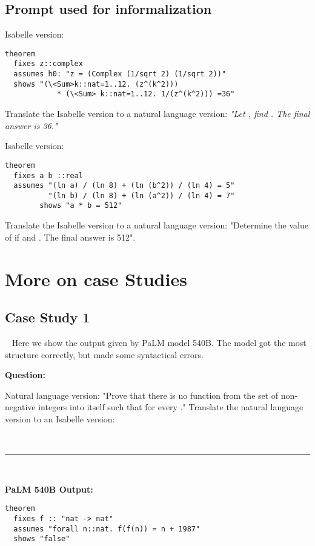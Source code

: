 \documentclass{article}
\begin{document}
\subsection{Prompt used for informalization}
\label{appendix:prompt_case_informal}

\begin{boxB}
Isabelle version:
\begin{lstlisting}
theorem
  fixes z::complex
  assumes h0: "z = (Complex (1/sqrt 2) (1/sqrt 2))"
  shows "(\<Sum>k::nat=1..12. (z^(k^2))) 
            * (\<Sum> k::nat=1..12. 1/(z^(k^2))) =36" 
\end{lstlisting}
Translate the Isabelle version to a natural language version:
\emph{"Let , find . The final answer is 36."}


Isabelle version:
\begin{lstlisting}
theorem
  fixes a b ::real
  assumes "(ln a) / (ln 8) + (ln (b^2)) / (ln 4) = 5"
          "(ln b) / (ln 8) + (ln (a^2)) / (ln 4) = 7"
        shows "a * b = 512"
\end{lstlisting}

Translate the Isabelle version to a natural language version:
"Determine the value of  if  and . The final answer is 512".

\end{boxB}

\section{More on case Studies}

\subsection{Case Study 1} 
~\label{appendix:case_study_1}
Here we show the output given by PaLM model 540B. The model got the most structure correctly, but made some syntactical errors.

\begin{boxB}
\textbf{Question:} 

Natural language version:
"Prove that there is no function  from the set of non-negative integers into itself such that  for every ."
Translate the natural language version to an Isabelle version:

\
\hrule
\

\textbf{PaLM 540B Output:} 

\begin{lstlisting}
theorem
  fixes f :: "nat -> nat"
  assumes "forall n::nat. f(f(n)) = n + 1987"
  shows "false"
\end{lstlisting}
\end{boxB}
\newpage
\end{document}

